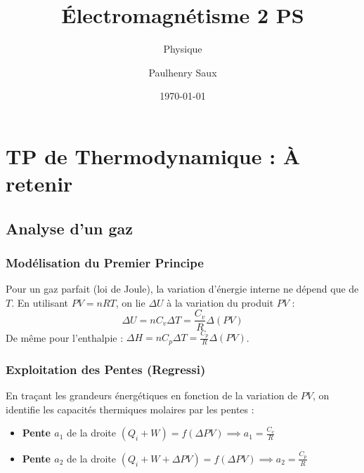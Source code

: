 \documentclass[french]{yLectureNote}
\title{Électromagnétisme 2 PS}
\subtitle{Physique}
\author{Paulhenry Saux}
\date{\today}
\begin{document}
\chapter{TP de Thermodynamique : À retenir}
\section{Analyse d'un gaz}

\subsection{Modélisation du Premier Principe}

\begin{definition}
Pour un gaz parfait (loi de Joule), la variation d'énergie interne ne dépend que de $T$. En utilisant $PV=nRT$, on lie $\Delta U$ à la variation du produit $PV$ :
$$\Delta U = n C_v \Delta T = \frac{C_v}{R} \Delta(PV)$$
De même pour l'enthalpie : $\Delta H = n C_p \Delta T = \frac{C_p}{R} \Delta(PV)$.
\end{definition}


\subsection{Exploitation des Pentes (Regressi)}

\begin{proposition}
En traçant les grandeurs énergétiques en fonction de la variation de $PV$, on identifie les capacités thermiques molaires par les pentes :
\begin{itemize}
    \item \textbf{Pente $a_1$} de la droite $(Q_i + W) = f(\Delta PV) \implies a_1 = \frac{C_v}{R}$
    \item \textbf{Pente $a_2$} de la droite $(Q_i + W + \Delta PV) = f(\Delta PV) \implies a_2 = \frac{C_p}{R}$
\end{itemize}
\end{proposition}
\end{document}
